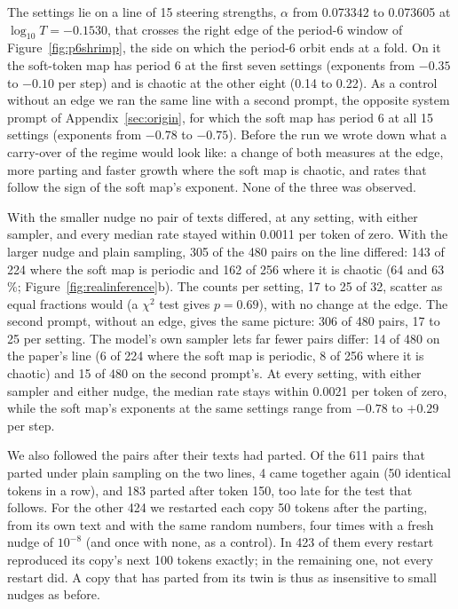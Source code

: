 \documentclass[11pt,letterpaper]{article}
\begin{document}
The settings lie on a line of 15 steering strengths, $\alpha$ from 0.073342 to 0.073605 at $\log_{10}T=-0.1530$, that
crosses the right edge of the period-6 window of Figure~\ref{fig:p6shrimp}, the side on which the period-6 orbit ends
at a fold. On it the soft-token map has period 6 at the first seven settings (exponents from $-0.35$ to $-0.10$ per
step) and is chaotic at the other eight (0.14 to 0.22). As a control without an edge we ran the same line with a
second prompt, the opposite system prompt of Appendix~\ref{sec:origin}, for which the soft map has period 6 at all 15
settings (exponents from $-0.78$ to $-0.75$). Before the run we wrote down what a carry-over of the regime would look
like: a change of both measures at the edge, more parting and faster growth where the soft map is chaotic, and rates
that follow the sign of the soft map's exponent. None of the three was observed.

With the smaller nudge no pair of texts differed, at any setting, with either sampler, and every median rate stayed
within 0.0011 per token of zero. With the larger nudge and plain sampling, 305 of the 480 pairs on the line differed:
143 of 224 where the soft map is periodic and 162 of 256 where it is chaotic (64 and 63\,\%;
Figure~\ref{fig:realinference}b). The counts per setting, 17 to 25 of 32, scatter as equal fractions would (a $\chi^2$
test gives $p=0.69$), with no change at the edge. The second prompt, without an edge, gives the same picture: 306 of
480 pairs, 17 to 25 per setting. The model's own sampler lets far fewer pairs differ: 14 of 480 on the paper's line (6
of 224 where the soft map is periodic, 8 of 256 where it is chaotic) and 15 of 480 on the second prompt's. At every
setting, with either sampler and either nudge, the median rate stays within 0.0021 per token of zero, while the soft
map's exponents at the same settings range from $-0.78$ to $+0.29$ per step.

We also followed the pairs after their texts had parted. Of the 611 pairs that parted under plain sampling on the two
lines, 4 came together again (50 identical tokens in a row), and 183 parted after token 150, too late for the test
that follows. For the other 424 we restarted each copy 50 tokens after the parting, from its own text and with the
same random numbers, four times with a fresh nudge of $10^{-8}$ (and once with none, as a control). In 423 of them
every restart reproduced its copy's next 100 tokens exactly; in the remaining one, not every restart did. A copy that
has parted from its twin is thus as insensitive to small nudges as before.
\end{document}
